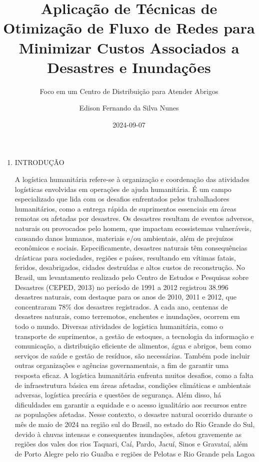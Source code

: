 \documentclass[
]{article}
\title{Aplicação de Técnicas de Otimização de Fluxo de Redes para
Minimizar Custos Associados a Desastres e Inundações}
\subtitle{Foco em um Centro de Distribuição para Atender Abrigos}
\author{Edison Fernando da Silva Nunes}
\date{2024-09-07}
\begin{document}
\maketitle

\begin{enumerate}
\def\labelenumi{\arabic{enumi}.}
\item
  INTRODUÇÃO

  A logística humanitária refere-se à organização e coordenação das
  atividades logísticas envolvidas em operações de ajuda humanitária. É
  um campo especializado que lida com os desafios enfrentados pelos
  trabalhadores humanitários, como a entrega rápida de suprimentos
  essenciais em áreas remotas ou afetadas por desastres. Os desastres
  resultam de eventos adversos, naturais ou provocados pelo homem, que
  impactam ecossistemas vulneráveis, causando danos humanos, materiais
  e/ou ambientais, além de prejuízos econômicos e sociais.
  Especificamente, desastres naturais têm consequências drásticas para
  sociedades, regiões e países, resultando em vítimas fatais, feridos,
  desabrigados, cidades destruídas e altos custos de reconstrução. No
  Brasil, um levantamento realizado pelo Centro de Estudos e Pesquisas
  sobre Desastres (CEPED, 2013) no período de 1991 a 2012 registrou
  38.996 desastres naturais, com destaque para os anos de 2010, 2011 e
  2012, que concentraram 78\% dos desastres registrados. A cada ano,
  centenas de desastres naturais, como terremotos, enchentes e
  inundações, ocorrem em todo o mundo. Diversas atividades de logística
  humanitária, como o transporte de suprimentos, a gestão de estoques, a
  tecnologia da informação e comunicação, a distribuição eficiente de
  alimentos, água e abrigos, bem como serviços de saúde e gestão de
  resíduos, são necessárias. Também pode incluir outras organizações e
  agências governamentais, a fim de garantir uma resposta eficaz. A
  logística humanitária enfrenta muitos desafios, como a falta de
  infraestrutura básica em áreas afetadas, condições climáticas e
  ambientais adversas, logística precária e questões de segurança. Além
  disso, há dificuldades em garantir a equidade e o acesso igualitário
  aos recursos entre as populações afetadas. Nesse contexto, o desastre
  natural ocorrido durante o mês de maio de 2024 na região sul do
  Brasil, no estado do Rio Grande do Sul, devido à chuvas intensas e
  consequentes inundações, afetou gravemente as regiões dos vales dos
  rios Taquari, Caí, Pardo, Jacuí, Sinos e Gravataí, além de Porto
  Alegre pelo rio Guaíba e regiões de Pelotas e Rio Grande pela Lagoa

\end{enumerate}
\end{document}
